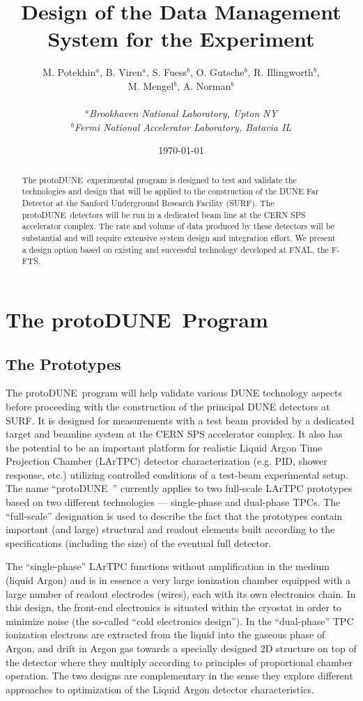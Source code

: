 \documentclass[pdftex,12pt,letter]{article}
\title{Design of the Data Management System for the \pd Experiment}
\date{\today}
\author{M. Potekhin$^a$, B. Viren$^a$, S. Fuess$^b$, O. Gutsche$^b$, R. Illingworth$^b$,\\M. Mengel$^b$,
 A. Norman$^b$\\
\ \\
$^a$\textit{Brookhaven National Laboratory, Upton NY}\\
$^b$\textit{Fermi National Accelerator Laboratory, Batavia IL}}
\newcommand{\pd}{protoDUNE\ }
\begin{document}
\maketitle



\begin{abstract}
The \pd experimental program is designed to test and validate the technologies and design that will be applied to the construction
of the DUNE Far Detector at the Sanford Underground Research Facility (SURF).  The \pd detectors will be run in a dedicated beam line
at the CERN SPS accelerator complex. The rate and volume of data produced by these detectors will be substantial and will require
extensive system design and integration effort. We present a design option based on existing and successful technology developed at
FNAL, the F-FTS.
\end{abstract}
\newpage
\tableofcontents
\newpage
\section{The \pd Program}
\label{S:1}
\subsection{The Prototypes}
The \pd program will help validate various DUNE technology aspects before proceeding with the construction of the principal DUNE detectors at SURF.
It is designed for measurements with a test beam provided by a dedicated target and beamline system at the CERN SPS accelerator complex.
It also has the potential to be an important platform for realistic Liquid Argon Time Projection Chamber (LArTPC) detector characterization
(e.g. PID, shower response, etc.) utilizing controlled conditions of a test-beam experimental setup. The name ``\pd'' currently applies to two
full-scale LArTPC prototypes based on two different technologies --- single-phase and dual-phase TPCs.
The ``full-scale'' designation is used to describe the fact that the prototypes
contain important (and large) structural and readout elements built according to the specifications (including the size)
of the eventual full detector.

The ``single-phase''  LArTPC functions without amplification in the medium (liquid Argon) and is in essence a very large ionization chamber
equipped with a large number of readout electrodes (wires), each with its own electronics chain. In this design, the front-end electronics is
situated within the cryostat in order to minimize noise (the so-called ``cold electronics design''). In the ``dual-phase''  TPC ionization
electrons are extracted from the liquid into the gaseous phase of Argon, and drift in Argon gas towards a specially designed 2D structure
on top of the detector where they multiply according to principles of proportional chamber operation. The two designs are complementary
in the sense they explore different approaches to optimization of the Liquid Argon detector characteristics.
\end{document}
